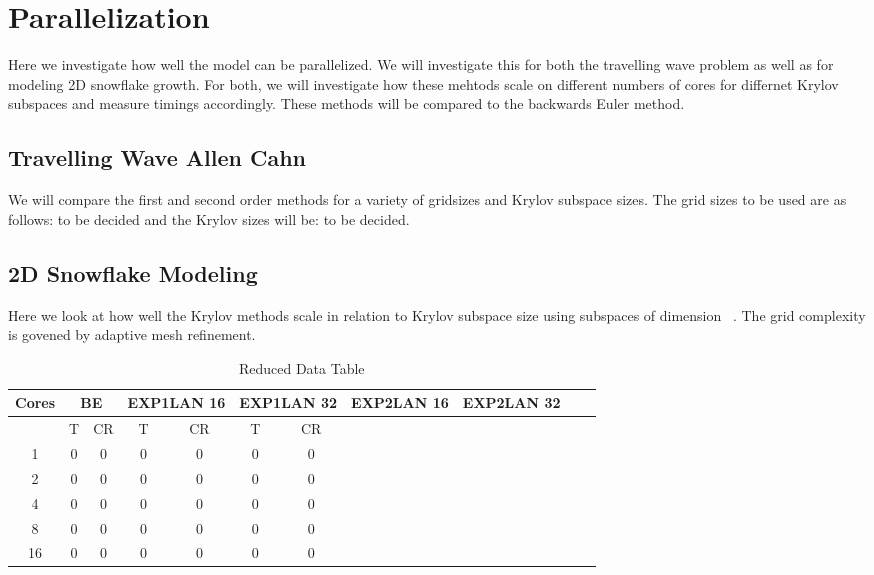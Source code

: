 \section{Parallelization}

Here we investigate how well the model can be parallelized.
We will investigate this for both the travelling wave problem as well as for modeling 2D snowflake growth.
For both, we will investigate how these mehtods scale on different numbers of cores for differnet Krylov subspaces and measure timings accordingly.
These methods will be compared to the backwards Euler method.

\subsection{Travelling Wave Allen Cahn}

We will compare the first and second order methods for a variety of gridsizes and Krylov subspace sizes.
The grid sizes to be used are as follows: to be decided and the Krylov sizes will be: to be decided.


\subsection{2D Snowflake Modeling}

Here we look at how well the Krylov methods scale in relation to Krylov subspace size using subspaces of dimension ~.
The grid complexity is govened by adaptive mesh refinement.

\begin{table}[H]
    \centering
    \begin{tabular}{| c | c c | c c | c c | c c | c c | c c |}
    \hline
    Cores & \multicolumn{2}{c|}{BE} & \multicolumn{2}{c|}{EXP1LAN 16} & \multicolumn{2}{c|}{EXP1LAN 32} & \multicolumn{2}{c|}{EXP2LAN 16} & \multicolumn{2}{c|}{EXP2LAN 32} \\
    \hline
    & T & CR & T & CR & T & CR \\
    \hline
    1  & 0 & 0 & 0 & 0 & 0 & 0 \\
    2  & 0 & 0 & 0 & 0 & 0 & 0 \\
    4  & 0 & 0 & 0 & 0 & 0 & 0 \\
    8  & 0 & 0 & 0 & 0 & 0 & 0 \\
    16 & 0 & 0 & 0 & 0 & 0 & 0 \\
    \hline
    \end{tabular}
    \caption{Reduced Data Table}
    \label{tab:reduced_data}
\end{table}
